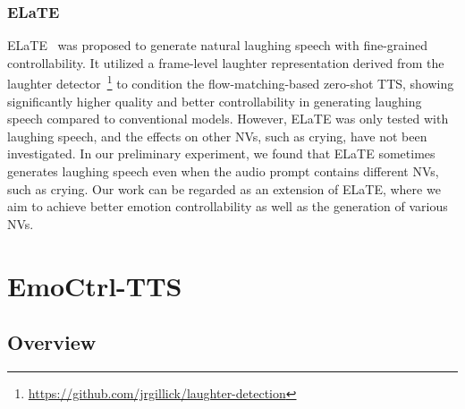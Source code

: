 \vspace{-.5em}
\subsubsection{ELaTE}
\vspace{-.5em}
\label{sec:elate}

ELaTE~\cite{kanda2024making} was proposed to generate natural laughing speech with fine-grained controllability.
It utilized a frame-level laughter representation derived from 
the laughter detector~\cite{ryokai2018capturing, gillick2021robust}\footnote{\label{fn:laugh}\url{https://github.com/jrgillick/laughter-detection}} 
to condition the flow-matching-based zero-shot TTS, showing significantly higher quality and better controllability in generating laughing speech compared to conventional models.
However, ELaTE was only tested with laughing speech, and the effects on other NVs, such as crying, have not been investigated. 
In our preliminary experiment, we found that ELaTE sometimes generates laughing speech even when the audio prompt contains different NVs, such as crying. Our work can be regarded as an extension of ELaTE, where we aim to achieve better emotion controllability as well as the generation of various NVs.

\vspace{-.5em}
\section{EmoCtrl-TTS}
\label{sec:method}

\vspace{-.5em}
\subsection{Overview}
\label{ssec: method overview}
\vspace{-.5em}

